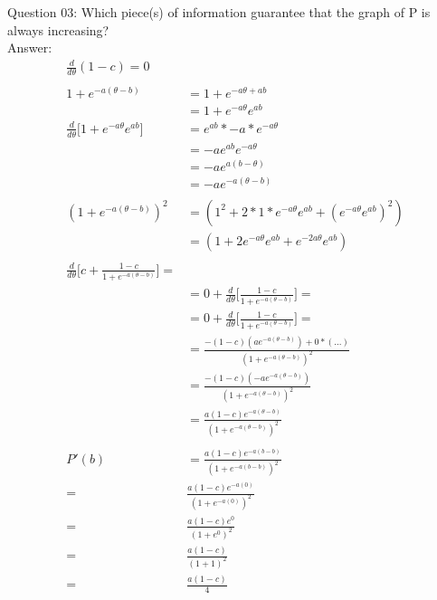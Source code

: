 \documentclass[10pt,a4paper]{article}
\author{Daniel Frederico Lins Leite}
\begin{document}
	Question 03:
	Which piece(s) of information guarantee that the graph of P is always increasing?\\
	Answer:
	\begin{align*}
		\frac{d}{d\theta} {(1-c)} = 0\\
		\\
		{1+e^{-a(\theta-b)}} 
		&= {1+e^{-a\theta+ab}} \\
		&= {1+e^{-a\theta}e^{ab}} \\
		\frac{d}{d\theta} \big[ {1+e^{-a\theta}e^{ab}} \big] &=
		e^{ab}*-a*e^{-a\theta}\\
		&= -ae^{ab}e^{-a\theta}\\
		&= -ae^{a(b-\theta)}\\		
		&= -ae^{-a(\theta-b)}\\				
		\\
		(1+e^{-a(\theta-b)})^2 &= (1^2 + 2*1*e^{-a\theta}e^{ab} + (e^{-a\theta}e^{ab})^2)\\
		&= (1 + 2e^{-a\theta}e^{ab} + e^{-2a\theta}e^{ab})\\
		\\
		\frac{d}{d\theta} \big[ {c+\frac{1-c}{1+e^{-a(\theta-b)}}} \big] =\\
		&= 0+\frac{d}{d\theta} \big[ {\frac{1-c}{1+e^{-a(\theta-b)}}} \big] =\\
		&= 0+\frac{d}{d\theta} \big[ {\frac{1-c}{1+e^{-a(\theta-b)}}} \big] =\\
		&= \frac{ -(1-c)(ae^{-a(\theta-b)}) + 0*(...) } {(1+e^{-a(\theta-b)})^2}\\		
		&= \frac{ -(1-c)(-ae^{-a(\theta-b)})} {(1+e^{-a(\theta-b)})^2}\\
		&= \frac{ a(1-c)e^{-a(\theta-b)}} {(1+e^{-a(\theta-b)})^2}\\
		\\
		P'(b) &= \frac{ a(1-c)e^{-a(b-b)}} {(1+e^{-a(b-b)})^2}\\		
		= &\frac{ a(1-c)e^{-a(0)}} {(1+e^{-a(0)})^2}\\
		= &\frac{ a(1-c)e^{0}} {(1+e^{0})^2}\\		
		= &\frac{ a(1-c)} {(1+1)^2}\\				
		= &\frac{ a(1-c)} {4}\\						
	\end{align*}
\end{document}
